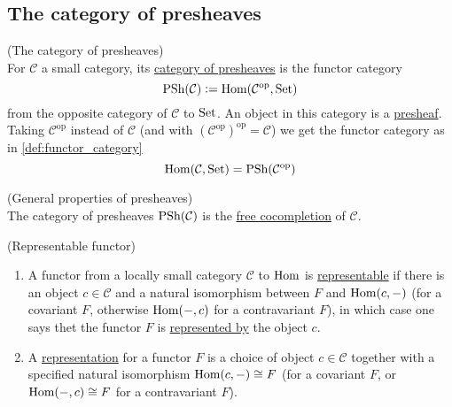 
\subsection{The category of presheaves}

\begin{definition}{(The category of presheaves)}\\
For $\mathcal{C}$ a small category, its \ul{category of presheaves} is the functor category
\[ \textup{PSh}(\mathcal{C}) := \textup{Hom}(\mathcal{C}^{\text{op}}, \textup{Set}) \]
from the opposite category of $\mathcal{C}$ to $\textup{Set}$.
An object in this category is a \ul{presheaf}.\\
\noindent Taking $\mathcal{C}^{\text{op}}$ instead of $\mathcal{C}$ (and with $(\mathcal{C}^{\text{op}})^{\text{op}} = \mathcal{C}$) we get the
functor category as in \ref{def:functor_category}
\[
\textup{Hom}(\mathcal{C}, \textup{Set}) = \textup{PSh}(\mathcal{C}^{\text{op}}) \]
\end{definition}

\begin{remark}{(General properties of presheaves)}\\
The category of presheaves $\textup{PSh}(\mathcal{C})$ is the \ul{free cocompletion} of $\mathcal{C}$.
\end{remark}

\begin{definition}{(Representable functor)}\label{def:repres_functor}
\begin{enumerate}
\renewcommand{\labelenumi}{(\theenumi)}
\item A functor from a locally small category $\mathcal{C}$ to $\textup{Hom}$ is \ul{representable} if there is an object $c \in \mathcal{C}$ and a
natural isomorphism between $F$ and $\textup{Hom}(c,-)$ (for a covariant $F$, otherwise $\textup{Hom}(-,c)$ for a contravariant $F$), in which case
one says thet the functor $F$ is \ul{represented by} the object $c$.
\item A \ul{representation} for a functor $F$ is a choice of object $c \in \mathcal{C}$ together with a specified natural isomorphism
$\textup{Hom}(c,-) \cong F$ (for a covariant $F$, or $\textup{Hom}(-,c) \cong F$ for a contravariant $F$).
\end{enumerate}
\end{definition}

